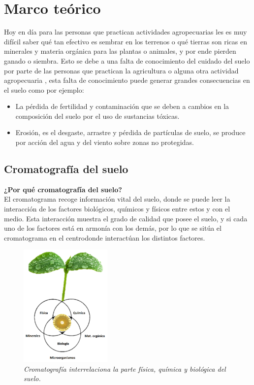 \section{Marco teórico}
Hoy en día para las personas que practican actividades agropecuarias les es muy
difícil saber qué tan efectivo es sembrar en los terrenos o qué tierras son ricas en
minerales y materia orgánica para las plantas o animales, y por ende pierden
ganado o siembra.
Esto se debe a una falta de conocimiento del cuidado del suelo por parte de las
personas que practican la agricultura o alguna otra actividad agropecuaria , esta
falta de conocimiento puede generar grandes consecuencias en el suelo como por
ejemplo:

\begin{itemize}
\item La pérdida de fertilidad y contaminación que se deben a cambios en la
composición del suelo por el uso de sustancias tóxicas.
\item Erosión, es el desgaste, arrastre y pérdida de partículas de suelo, se produce
por acción del agua y del viento sobre zonas no protegidas.
\end{itemize}

\subsection{Cromatografía del suelo}
\textbf{¿Por qué cromatografía del suelo?}\\
El cromatograma recoge información vital del suelo, donde se puede leer la interacción
de los factores biológicos, químicos y físicos entre estos y con el medio. Esta interacción muestra el grado de calidad que posee el suelo, y si cada uno de los factores está en armonía con los demás, por lo que se sitúa el cromatograma en el centrodonde interactúan los distintos factores.

\begin{figure}[H]
 \centering	
   \includegraphics[width=0.4\textwidth]{images/1.png}
   \caption{\textit{Cromatografía interrelaciona la parte física, química y biológica del suelo.}}
   \end{figure}	

